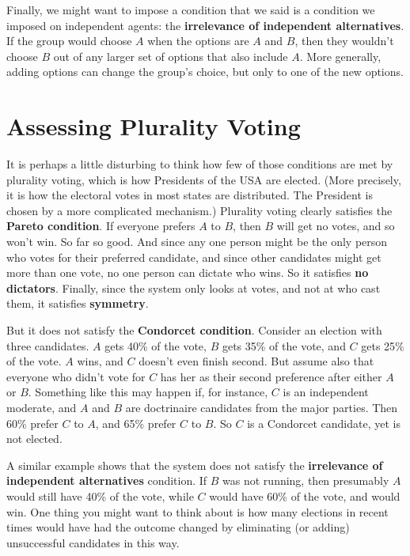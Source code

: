 \documentclass[11pt,]{article}
\begin{document}
Finally, we might want to impose a condition that we said is a condition
we imposed on independent agents: the \textbf{irrelevance of independent
alternatives}. If the group would choose \(A\) when the options are
\(A\) and \(B\), then they wouldn't choose \(B\) out of any larger set
of options that also include \(A\). More generally, adding options can
change the group's choice, but only to one of the new options.

\hypertarget{assessing-plurality-voting}{%
\section{Assessing Plurality Voting}\label{assessing-plurality-voting}}

It is perhaps a little disturbing to think how few of those conditions
are met by plurality voting, which is how Presidents of the USA are
elected. (More precisely, it is how the electoral votes in most states
are distributed. The President is chosen by a more complicated
mechanism.) Plurality voting clearly satisfies the \textbf{Pareto
condition}. If everyone prefers \(A\) to \(B\), then \(B\) will get no
votes, and so won't win. So far so good. And since any one person might
be the only person who votes for their preferred candidate, and since
other candidates might get more than one vote, no one person can dictate
who wins. So it satisfies \textbf{no dictators}. Finally, since the
system only looks at votes, and not at who cast them, it satisfies
\textbf{symmetry}.

But it does not satisfy the \textbf{Condorcet condition}. Consider an
election with three candidates. \(A\) gets 40\% of the vote, \(B\) gets
35\% of the vote, and \(C\) gets 25\% of the vote. \(A\) wins, and \(C\)
doesn't even finish second. But assume also that everyone who didn't
vote for \(C\) has her as their second preference after either \(A\) or
\(B\). Something like this may happen if, for instance, \(C\) is an
independent moderate, and \(A\) and \(B\) are doctrinaire candidates
from the major parties. Then 60\% prefer \(C\) to \(A\), and 65\% prefer
\(C\) to \(B\). So \(C\) is a Condorcet candidate, yet is not elected.

A similar example shows that the system does not satisfy the
\textbf{irrelevance of independent alternatives} condition. If \(B\) was
not running, then presumably \(A\) would still have 40\% of the vote,
while \(C\) would have 60\% of the vote, and would win. One thing you
might want to think about is how many elections in recent times would
have had the outcome changed by eliminating (or adding) unsuccessful
candidates in this way.
\end{document}
